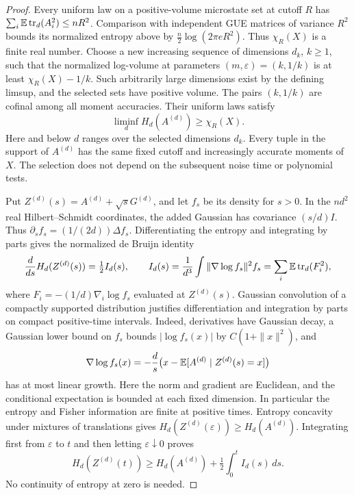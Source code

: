 \begin{proof}
Every uniform law on a positive-volume microstate set at cutoff $R$
has $\sum_i\mathbb E\operatorname{tr}_d(A_i^2)\leq nR^2$. Comparison with independent
GUE matrices of variance $R^2$ bounds its normalized entropy above by
$\frac n2\log(2\pi eR^2)$. Thus $\chi_R(X)$ is a finite real number.
Choose a new increasing sequence of dimensions $d_k$, $k\geq1$, such that the normalized log-volume
at parameters $(m,\varepsilon)=(k,1/k)$ is at least
$\chi_R(X)-1/k$. Such arbitrarily large dimensions exist by the defining
limsup, and the selected sets have positive volume. The pairs $(k,1/k)$
are cofinal among all moment accuracies. Their uniform laws satisfy
\begin{equation}\label{eq:initialentropy}
 \liminf_d H_d(A^{(d)})\geq\chi_R(X).
\end{equation}
Here and below $d$ ranges over the selected dimensions $d_k$.
Every tuple in the support of $A^{(d)}$ has the same fixed cutoff and
increasingly accurate moments of $X$. The selection does not depend on
the subsequent noise time or polynomial tests.

Put $Z^{(d)}(s)=A^{(d)}+\sqrt s G^{(d)}$, and let $f_s$ be its density
for $s>0$. In the $nd^2$ real Hilbert--Schmidt coordinates, the added
Gaussian has covariance $(s/d)I$. Thus
$\partial_s f_s=(1/(2d))\Delta f_s$. Differentiating the entropy and
integrating by parts gives the normalized de Bruijn identity
\begin{equation}\label{eq:matrix-debruijn}
 \frac{d}{ds}H_d(Z^{(d)}(s))=\tfrac12 I_d(s),\qquad
 I_d(s)=\frac1{d^3}\int\|\nabla\log f_s\|^2 f_s
       =\sum_i\mathbb E\operatorname{tr}_d(F_i^2),
\end{equation}
where $F_i=-(1/d)\nabla_i\log f_s$ evaluated at $Z^{(d)}(s)$.
Gaussian convolution of a compactly supported distribution justifies
differentiation and integration by parts on compact positive-time
intervals. Indeed, derivatives have Gaussian decay, a Gaussian lower
bound on $f_s$ bounds $|\log f_s(x)|$ by $C(1+\|x\|^2)$, and
\[
 \nabla\log f_s(x)
 =-\frac d s\big(x-\mathbb E[A^{(d)}\mid Z^{(d)}(s)=x]\big)
\]
has at most linear growth. Here the norm and gradient are Euclidean,
and the conditional expectation is bounded at each fixed dimension.
In particular the entropy and Fisher information are finite at positive
times.
Entropy concavity under mixtures of translations gives
$H_d(Z^{(d)}(\varepsilon))\geq H_d(A^{(d)})$. Integrating first from
$\varepsilon$ to $t$ and then letting $\varepsilon\downarrow0$ proves
\begin{equation}\label{eq:classgain}
 H_d(Z^{(d)}(t))\geq H_d(A^{(d)})+\tfrac12\int_0^t I_d(s)\,ds.
\end{equation}
No continuity of entropy at zero is needed.


\end{proof}
